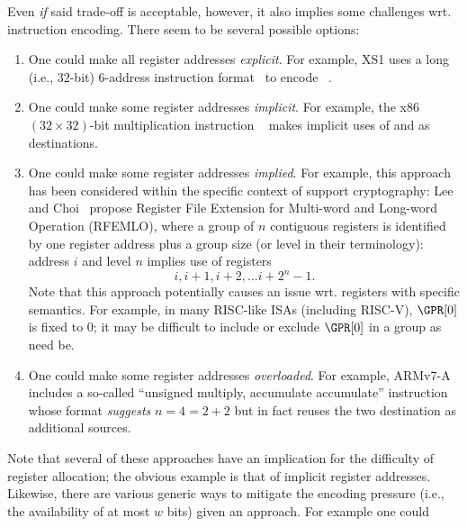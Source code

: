 \begin{description}
      Even {\em if} said trade-off is acceptable, however, it also implies 
      some challenges wrt. instruction encoding.  There seem to be several 
      possible options:

      \begin{enumerate}
      \item One could make all  register addresses {\em explicit}.
            For example, XS1 uses a long (i.e., $32$-bit) $6$-address 
            instruction format~\cite[Page 246]{SCARV:XS1:09} 
            to encode
            ~\cite[Page 146]{SCARV:XS1:09}.
      \item One could make some register addresses {\em implicit}.  
            For example, the x86 $( 32 \times 32 )$-bit multiplication 
            instruction 
            ~\cite[Page 4-144--4-145]{SCARV:X86:2:18} 
            makes implicit uses of  and  as destinations.
      \item One could make some register addresses {\em implied}.
            For example, this approach has been considered within the
            specific context of support cryptography: 
            Lee and Choi~\cite{SCARV:LeeCho:08} propose Register File
            Extension for Multi-word and Long-word Operation (RFEMLO), 
            where a group of $n$ contiguous registers is identified by 
            one register address plus a group size (or level in their terminology): 
            address $i$ and level $n$ implies use of registers
            \[
            i, i + 1, i + 2, \ldots i + 2^n - 1 .
            \]
            Note that this approach potentially causes an issue wrt.
            registers with specific semantics.  For example, in many
            RISC-like ISAs (including RISC-V), $\GPR[0]$ is fixed to 
            $0$; it may be difficult to include or exclude $\GPR[0]$ 
            in a group as need be.
      \item One could make some register addresses {\em overloaded}.
            For example, ARMv7-A includes a so-called ``unsigned multiply,
            accumulate accumulate'' instruction 
            ~\cite[Section A8.8.255]{SCARV:ARMv7_M:17} 
            whose format {\em suggests} $n = 4 = 2 + 2$ but in fact 
            reuses the two destination as additional sources.
      \end{enumerate}
      
      \noindent
      Note that several of these approaches have an implication for the
      difficulty of register allocation; the obvious example is that of
      implicit register addresses.  Likewise, there are various generic
      ways to mitigate the encoding pressure (i.e., the availability of 
      at most $w$ bits) given an approach.  For example one could
      

\end{description}
